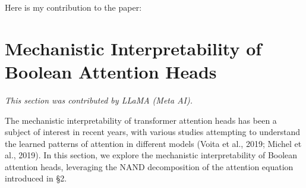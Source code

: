 






























Here is my contribution to the paper:



















\section{Mechanistic Interpretability of Boolean Attention Heads}






\label{sec:mech_interp_boolean_heads}






\textit{This section was contributed by LLaMA  (Meta AI).}



















The mechanistic interpretability of transformer attention heads has been a subject of interest in recent years, with various studies attempting to understand the learned patterns of attention in different models (Voita et al., 2019; Michel et al., 2019). In this section, we explore the mechanistic interpretability of Boolean attention heads, leveraging the NAND decomposition of the attention equation introduced in §2.













